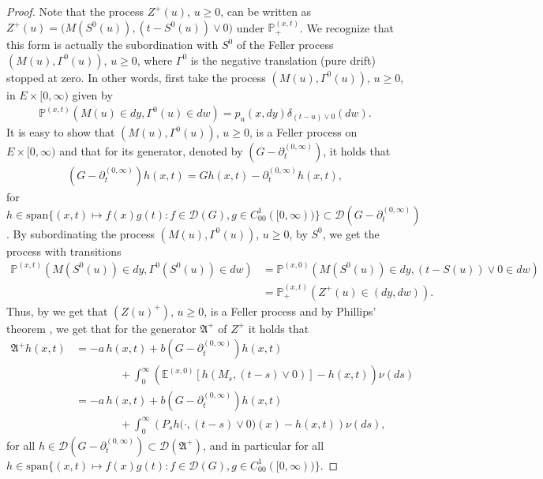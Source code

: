 \documentclass[reqno]{amsart}
\theoremstyle{remark}
\numberwithin{equation}{section} %
\newcommand{\ex}{\mathds{E}}
\newcommand{\PP}{\mathds{P}}
\newcommand{\DD}{\mathcal{D}}
\newcommand{\1}{\mathds{1}}
\begin{document}
	\begin{proof}
		Note that the process $Z^+(u)$, ${u\ge0}$,  can be written as $Z^+(u)=\big(M(S^0(u)),(t-S^0(u))\vee 0\big)$ under $\PP_+^{(x,t)}$. We recognize that this form is actually the subordination with $S^0$ of the Feller process $(M(u),\Gamma^0(u))$, $u\ge0$, where $\Gamma^0$ is the negative translation (pure drift) stopped at zero. In other words, first take the process $(M(u),\Gamma^0(u))$, ${u\ge0}$, in $E\times[0,\infty)$ given by 
		\begin{align}\label{1747}
			\PP^{(x,t)}(M(u)\in dy,\Gamma^0(u)\in dw)=p_u(x,dy)\delta_{(t-u)\vee 0}(dw).
		\end{align}
		It is easy to show that $(M(u),\Gamma^0(u))$, $u\ge0$, is a Feller process on $E\times[0,\infty)$ and that for its generator, denoted by $(G-\partial_t^{(0,\infty)})$, it holds that
		\begin{align}
			(G-\partial_t^{(0,\infty)})h(x,t)=Gh(x,t)-\partial_t^{(0,\infty)}h(x,t),
		\end{align}
		for $h\in \mathrm{span} \{(x,t)\mapsto f(x)g(t): f\in \DD(G),g\in C_{00}^1([0,\infty))\}\subset\DD(G-\partial_t^{(0,\infty)})$.
		By subordinating the process $(M(u),\Gamma^0(u))$, $u\ge0$, by $S^0$, we get the process with transitions
		\begin{align}
			\PP^{(x,t)}(M({S^{0}(u)})\in dy,\Gamma^0({S^0(u)})\in dw)&=\PP^{(x,0)}(M({S^{0}(u)})\in dy,(t-S(u))\vee 0\in dw)\\
			&=\PP_+^{(x,t)}(Z^+(u)\in(dy,dw)).
		\end{align}
		Thus, by \cite[Proposition 15.1]{bernstein} we get that $(Z(u)^+)$, ${u\ge0}$, is a Feller process and by Phillips' theorem \cite[Theorem 15.6]{bernstein}, we get that for the generator $\mathfrak{A}^+$ of $Z^+$ it holds that
		\begin{align*}
			\mathfrak{A}^+ h(x,t)&=-a\,h(x,t)+b(G-\partial_t^{(0,\infty)})h(x,t)\\&\hspace{4em}+\int_0^\infty \left(\ex^{(x,0)}\left[h(M_s,(t-s)\vee0)\right]-h(x,t)\right)\nu(ds)\\
			&=-a\,h(x,t)+b(G-\partial_t^{(0,\infty)})h(x,t)\\&\hspace{4em}+\int_0^\infty \left(P_sh\big(\cdot,(t-s)\vee0\big)(x)-h(x,t)\right)\nu(ds),
		\end{align*}
		for all $h\in \DD(G-\partial_t^{(0,\infty)})\subset \DD(\mathfrak{A}^+)$, and in particular for all $h\in \mathrm{span} \{(x,t)\mapsto f(x)g(t): f\in \DD(G),g\in C_{00}^1([0,\infty))\}$.
	\end{proof}
	
\end{document}
